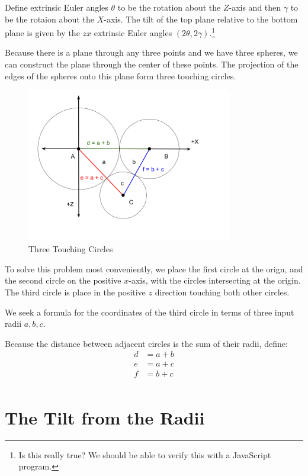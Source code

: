 \documentclass{article}
\begin{document}
Define extrinsic Euler angles $\theta$ to be the rotation about the $Z$-axis and then $\gamma$ to
be the rotaion about the $X$-axis.
The tilt of the top plane relative
to the bottom plane is given by the $zx$ extrinsic Euler angles $(2\theta, 2\gamma)$.\footnote{Is this really true?
We should be able to verify this with a JavaScript program.}

Because there is a plane through any three points and we have three spheres, we can construct the plane through
the center of these points.
The projection of the edges of the spheres onto this plane form three touching circles.

\begin{figure}
     \centering
     \includegraphics[width=0.8\textwidth]{figures/ThreeTouchingPlanarCircles.png}
     \caption{Three Touching Circles}
  \label{fig:Tangent}
\end{figure}

To solve this problem most conveniently, we place the first circle at the orign, and the second circle
on the positive $x$-axis, with the circles intersecting at the origin.
The third circle is place in the positive $z$ direction touching both other circles.

We seek a formula for the coordinates of the third circle in terms of three input radii $a,b,c$.

Because the distance between adjacent circles is the sum of their radii, define:
\begin{align}
  d  &= a + b \\
  e  &= a + c \\
  f  &= b + c \\
\end{align}

\section{The Tilt from the Radii}
\end{document}
